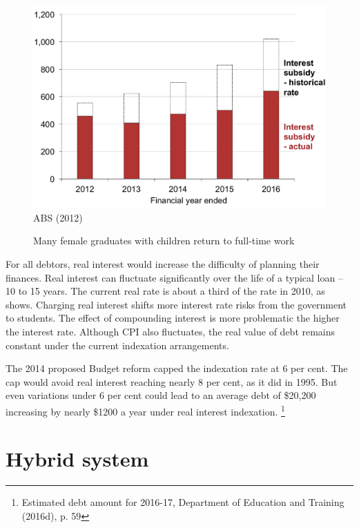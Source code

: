 \documentclass[embargoed]{grattan}
\begin{document}
\begin{figure}
\caption{Many female graduates with children return to full-time work}\label{fig:fig16-many-female-grads-with-children-return-to-full-time-work}


\includegraphics[page=16]{atlas/Chartpack.pdf}
{ABS (2012)}
\end{figure}


For all debtors, real interest would increase the difficulty of planning their finances.
Real interest can fluctuate significantly over the life of a typical loan -- 10 to 15 years.
The current real rate is about a third of the rate in 2010, as  shows.
Charging real interest shifts more interest rate risks from the government to students.
The effect of compounding interest is more problematic the higher the interest rate.
Although \gls{CPI} also fluctuates, the real value of debt remains constant under the current indexation arrangements.

The 2014 proposed Budget reform capped the indexation rate at 6 per cent.
The cap would avoid real interest reaching nearly 8 per cent, as it did in 1995.
But even variations under 6 per cent could lead to an average debt of \$20,200 increasing by nearly \$1200 a year under real interest indexation.%
\footnote{Estimated debt amount for 2016-17, Department of Education and Training (2016d), p. 59}

\section{Hybrid system}\label{sec:hybrid-system}
\end{document}
